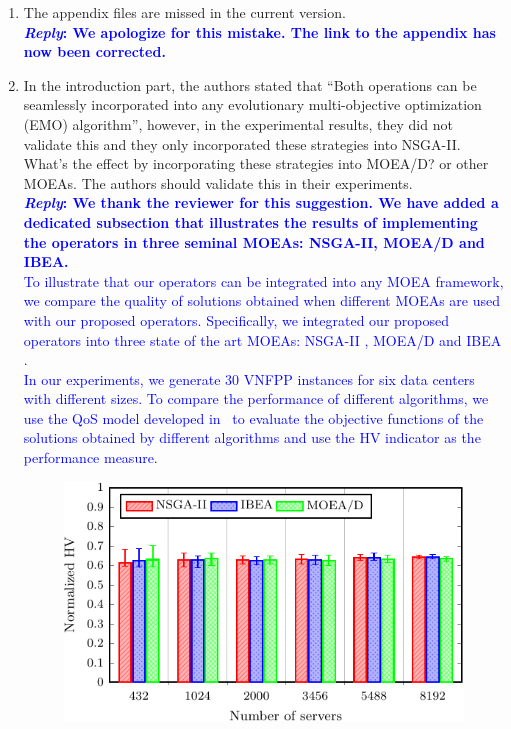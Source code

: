 \begin{enumerate}
      \item\textsf{The appendix files are missed in the current version.}\\
            \textcolor{blue}{\textbf{\textit{Reply}: We apologize for this mistake. The link to the appendix has now been corrected.}} \\

      \item\textsf{In the introduction part, the authors stated that “Both operations can be seamlessly incorporated into any evolutionary multi-objective optimization (EMO) algorithm”, however, in the experimental results, they did not validate this and they only incorporated these strategies into NSGA-II. What’s the effect by incorporating these strategies into MOEA/D? or other MOEAs. The authors should validate this in their experiments.}\\
            \textcolor{blue}{\textbf{\textit{Reply}: We thank the reviewer for this suggestion. We have added a dedicated subsection that illustrates the results of implementing the operators in three seminal MOEAs: NSGA-II, MOEA/D and IBEA.}}\\
            \textcolor{blue}{
                  To illustrate that our operators can be integrated into any MOEA framework, we compare the quality of solutions obtained when different MOEAs are used with our proposed operators. Specifically, we integrated our proposed operators into three state of the art MOEAs: NSGA-II \cite{DebAPM02}, MOEA/D \cite{ZhangL07} and IBEA \cite{ZitzlerK04}. \\In our experiments, we generate $30$ VNFPP instances for six data centers with different sizes. To compare the performance of different algorithms, we use the QoS model developed in~ to evaluate the objective functions of the solutions obtained by different algorithms and use the HV indicator as the performance measure.
            }
            \begin{figure}[h!]
                  \centering
                  \includegraphics[width=.7\columnwidth]{figs/moeas-crop}

\end{figure}
\end{enumerate}
